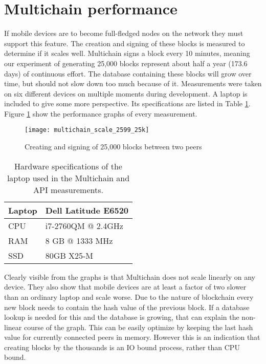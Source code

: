 \section{Multichain performance}\label{sec:multichain_perf}
If mobile devices are to become full-fledged nodes on the network they must support this feature.
The creation and signing of these blocks is measured to determine if it scales well.
Multichain signs a block every 10 minutes, meaning our experiment of generating 25,000 blocks represent about half a year (173.6 days) of continuous effort.
The database containing these blocks will grow over time, but should not slow down too much because of it.
Measurements were taken on six different devices on multiple moments during development.
A laptop is included to give some more perspective.
Its specifications are listed in Table \ref{table:specs_laptop}.
Figure \ref{fig:multichain_25} show the performance graphs of every measurement.
\begin{figure}[H]
	\centering
	\texttt{[image: multichain\_scale\_2599\_25k]}
	\caption{Creating and signing of 25,000 blocks between two peers}
	\label{fig:multichain_25}
\end{figure}
\begin{table}[H]
	\begin{tabular}{l | l} \hline
		Laptop & Dell Latitude E6520 \\ \hline \hline
		CPU & i7-2760QM @ 2.4GHz \\ \hline
		RAM & 8 GB @ 1333 MHz \\ \hline %
		SSD & 80GB X25-M \\ \hline %
	\end{tabular}
	\caption{Hardware specifications of the laptop used in the Multichain and API measurements.}
	\label{table:specs_laptop}
\end{table}
Clearly visible from the graphs is that Multichain does not scale linearly on any device.
They also show that mobile devices are at least a factor of two slower than an ordinary laptop and scale worse.
Due to the nature of blockchain every new block needs to contain the hash value of the previous block.
If a database lookup is needed for this and the database is growing, that can explain the non-linear course of the graph.
This can be easily optimize by keeping the last hash value for currently connected peers in memory.
However this is an indication that creating blocks by the thousands is an IO bound process, rather than CPU bound.
